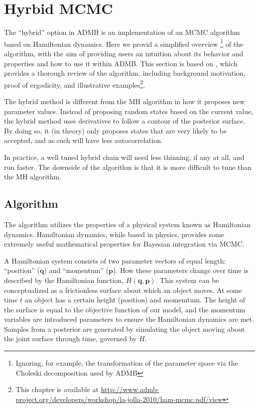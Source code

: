 \documentclass{article}\usepackage[]{graphicx}\usepackage[]{color}
\begin{document}
\section{Hyrbid MCMC}\label{sec:hybrid}
The ``hybrid'' option in ADMB is an implementation of an
MCMC algorithm based on Hamiltonian dynamics. Here we provid
a simplified overview \footnote{Ignoring, for example, the
  transformation of the parameter space via the Choleski
  decomposition used by ADMB} of the algorithm, with the aim
of providing users an intuition about its behavior and
properties and how to use it within ADMB. This section is
based on \cite{brooks2011}, which provides a thorough review
of the algorithm, including background motivation, proof of
ergodicity, and illustrative examples\footnote{This chapter
  is available at
  \url{http://www.admb-project.org/developers/workshop/la-jolla-2010/ham-mcmc.pdf/view}}.

The hybrid method is different from the MH algorithm in how
it proposes new parameter values. Instead of proposing
random states based on the current value, the hybrid method
uses derivatives to follow a contour of the posterior
surface. By doing so, it (in theory) only proposes states
that are very likely to be accepted, and as such will have
less autocorrelation.

In practice, a well tuned hybrid chain will need less
thinning, if any at all, and run faster. The downside of the
algorithm is that it is more difficult to tune than the MH
algorithm.
\subsection{Algorithm}
The algorithm utilizes the properties of a physical system
known as Hamiltonian dynamics. Hamiltonian dynamics, while
based in physics, provides some extremely useful
mathematical properties for Bayesian integration via MCMC.

A Hamiltonian system consists of two parameter vectors of
equal length: ``position'' ($\mathbf{q}$) and ``momentum''
($\mathbf{p}$). How these parameters change over time is
described by the Hamiltonian function,
$H(\mathbf{q},\mathbf{p})$. This system can be
conceptualized as a frictionless surface about which an
object moves. At some time $t$ an object has a certain
height (position) and momemtum. The height of the surface is
equal to the objective function of our model, and the
momentum variables are introduced parameters to ensure the
Hamiltonian dynamics are met. Samples from a posterior are
generated by simulating the object moving about the joint
surface through time, governed by $H$.
\end{document}
